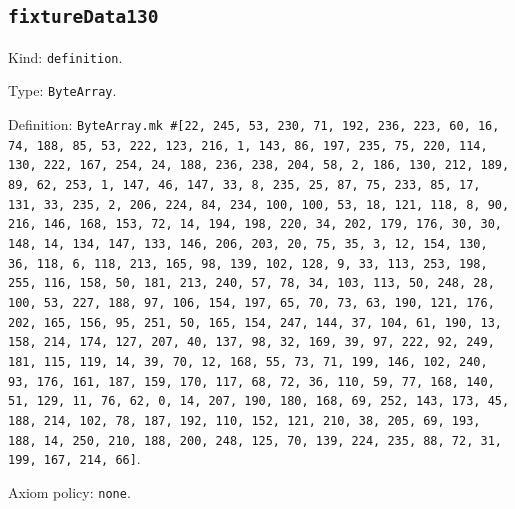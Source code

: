 \documentclass[11pt]{article}
\begin{document}
\subsection*{\texttt{fixtureData130}}
\noindent Kind: \texttt{definition}.\par
\noindent Type: \texttt{ByteArray}.\par
\noindent Definition: \texttt{ByteArray.mk \#[22, 245, 53, 230, 71, 192, 236, 223, 60, 16, 74, 188, 85, 53, 222, 123, 216, 1, 143, 86, 197, 235, 75, 220, 114, 130, 222, 167, 254, 24, 188, 236, 238, 204, 58, 2, 186, 130, 212, 189, 89, 62, 253, 1, 147, 46, 147, 33, 8, 235, 25, 87, 75, 233, 85, 17, 131, 33, 235, 2, 206, 224, 84, 234, 100, 100, 53, 18, 121, 118, 8, 90, 216, 146, 168, 153, 72, 14, 194, 198, 220, 34, 202, 179, 176, 30, 30, 148, 14, 134, 147, 133, 146, 206, 203, 20, 75, 35, 3, 12, 154, 130, 36, 118, 6, 118, 213, 165, 98, 139, 102, 128, 9, 33, 113, 253, 198, 255, 116, 158, 50, 181, 213, 240, 57, 78, 34, 103, 113, 50, 248, 28, 100, 53, 227, 188, 97, 106, 154, 197, 65, 70, 73, 63, 190, 121, 176, 202, 165, 156, 95, 251, 50, 165, 154, 247, 144, 37, 104, 61, 190, 13, 158, 214, 174, 127, 207, 40, 137, 98, 32, 169, 39, 97, 222, 92, 249, 181, 115, 119, 14, 39, 70, 12, 168, 55, 73, 71, 199, 146, 102, 240, 93, 176, 161, 187, 159, 170, 117, 68, 72, 36, 110, 59, 77, 168, 140, 51, 129, 11, 76, 62, 0, 14, 207, 190, 180, 168, 69, 252, 143, 173, 45, 188, 214, 102, 78, 187, 192, 110, 152, 121, 210, 38, 205, 69, 193, 188, 14, 250, 210, 188, 200, 248, 125, 70, 139, 224, 235, 88, 72, 31, 199, 167, 214, 66]}.\par
\noindent Axiom policy: \texttt{none}.\par
\end{document}
